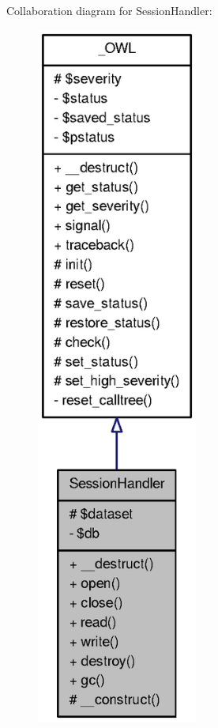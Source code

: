 Collaboration diagram for SessionHandler:\nopagebreak
\begin{figure}[H]
\begin{center}
\leavevmode
\includegraphics[width=150pt]{classSessionHandler__coll__graph}
\end{center}
\end{figure}
